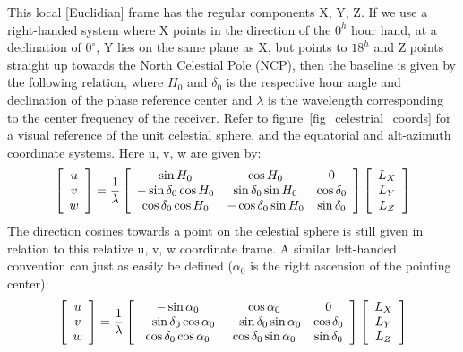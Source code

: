 This local [Euclidian] frame has the regular components X, Y, Z. If we use a right-handed system where X points in the direction 
of the $0^h$ hour hand, at a declination of $0^{\circ}$, Y lies on the same plane as X, but points to $18^h$ and Z points straight up 
towards the North Celestial Pole (NCP), then the baseline is given by the following relation, where $H_0$ and $\delta_0$ is the 
respective hour angle and declination of the phase reference center and $\lambda$ is the wavelength corresponding to the center 
frequency of the receiver. Refer to figure~\ref{fig_celestrial_coords} for a visual reference of the unit celestial sphere, and 
the equatorial and alt-azimuth coordinate systems. Here u, v, w are given by:
\begin{equation}
 \label{EQN_RIGHTHANDED_SYSTEM}
 \left[\begin{array}{c}
     u\\
     v \\
     w \\
    \end{array}\right] = \frac{1}{\lambda}
 \left[\begin{array}{c c c}
     \sin{H_0} 			& \cos{H_0}			& 0 \\
     -\sin{\delta_0}\cos{H_0} 	& \sin{\delta_0}\sin{H_0}	& \cos{\delta_0}\\
     \cos{\delta_0}\cos{H_0} 	& -\cos{\delta_0}\sin{H_0}	& \sin{\delta_0}\\
    \end{array}\right]   
 \left[\begin{array}{c}
     L_X \\
     L_Y \\
     L_Z \\
    \end{array}\right]
\end{equation}
The direction cosines towards a point on the celestial sphere is still given in relation to this relative u, v, w coordinate frame.
A similar left-handed convention can just as easily be defined ($\alpha_0$ is the right ascension of the pointing center):
\begin{equation}
 \left[\begin{array}{c}
     u\\
     v \\
     w \\
    \end{array}\right] = \frac{1}{\lambda}
 \left[\begin{array}{c c c}
     -\sin{\alpha_0} 			& \cos{\alpha_0}		& 0 \\
     -\sin{\delta_0}\cos{\alpha_0} 	& -\sin{\delta_0}\sin{\alpha_0}	& \cos{\delta_0}\\
     \cos{\delta_0}\cos{\alpha_0} 	& \cos{\delta_0}\sin{\alpha_0}	& \sin{\delta_0}\\
    \end{array}\right]   
 \left[\begin{array}{c}
     L_X \\
     L_Y \\
     L_Z \\
    \end{array}\right]
\end{equation}
